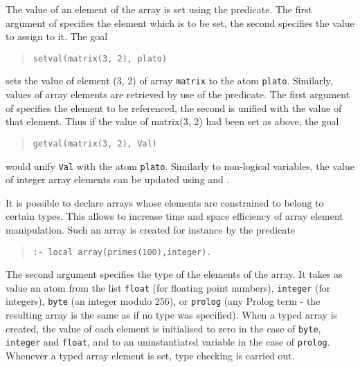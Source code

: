 The value of an element of the array is set using the 
predicate. The first argument of  specifies the element which is
to be set, the second specifies the value to assign to it.
The goal
\begin{quote}\begin{verbatim}
setval(matrix(3, 2), plato)
\end{verbatim}\end{quote}
sets the value
of element (3, 2) of array {\tt matrix} to the atom {\tt plato}.
Similarly, values of array elements are retrieved by use of the 
predicate. The first argument of  specifies the element to be
referenced, the second is unified with the value of that element.
Thus if the value of matrix(3, 2) had been set as above, the goal
\begin{quote}\begin{verbatim}
getval(matrix(3, 2), Val)
\end{verbatim}\end{quote}
would unify {\tt Val} with the atom {\tt plato}.
Similarly to non-logical variables, the value of integer array elements
can be updated using  and .

It is possible to declare arrays whose elements are
constrained to belong to certain types. This allows {\eclipse} to increase
time and space efficiency of array element manipulation.
Such an array is created for instance by the predicate
\begin{quote}\begin{verbatim}
:- local array(primes(100),integer).
\end{verbatim}\end{quote}
The second argument specifies the type of the elements of the array.
It takes as value an atom from the
list {\tt float} (for floating point numbers),
{\tt integer} (for integers), {\tt byte} (an integer modulo 256),
or {\tt prolog} (any Prolog term - the resulting array is the
same as if no type was specified).
When a typed array is created, the value of each element is initialised to zero
in the case of {\tt byte}, {\tt integer} and {\tt float}, and to
an uninstantiated variable in the case of {\tt prolog}.
Whenever a typed array element is set, type checking is carried out.


